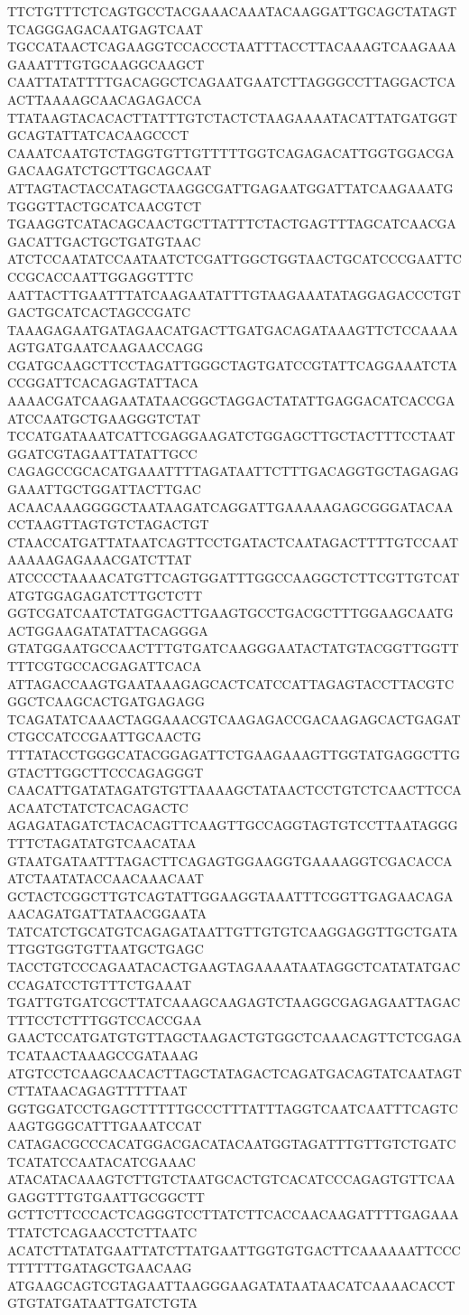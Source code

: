 TTCTGTTTCTCAGTGCCTACGAAACAAATACAAGGATTGCAGCTATAGTTCAGGGAGACAATGAGTCAAT
TGCCATAACTCAGAAGGTCCACCCTAATTTACCTTACAAAGTCAAGAAAGAAATTTGTGCAAGGCAAGCT
CAATTATATTTTGACAGGCTCAGAATGAATCTTAGGGCCTTAGGACTCAACTTAAAAGCAACAGAGACCA
TTATAAGTACACACTTATTTGTCTACTCTAAGAAAATACATTATGATGGTGCAGTATTATCACAAGCCCT
CAAATCAATGTCTAGGTGTTGTTTTTGGTCAGAGACATTGGTGGACGAGACAAGATCTGCTTGCAGCAAT
ATTAGTACTACCATAGCTAAGGCGATTGAGAATGGATTATCAAGAAATGTGGGTTACTGCATCAACGTCT
TGAAGGTCATACAGCAACTGCTTATTTCTACTGAGTTTAGCATCAACGAGACATTGACTGCTGATGTAAC
ATCTCCAATATCCAATAATCTCGATTGGCTGGTAACTGCATCCCGAATTCCCGCACCAATTGGAGGTTTC
AATTACTTGAATTTATCAAGAATATTTGTAAGAAATATAGGAGACCCTGTGACTGCATCACTAGCCGATC
TAAAGAGAATGATAGAACATGACTTGATGACAGATAAAGTTCTCCAAAAAGTGATGAATCAAGAACCAGG
CGATGCAAGCTTCCTAGATTGGGCTAGTGATCCGTATTCAGGAAATCTACCGGATTCACAGAGTATTACA
AAAACGATCAAGAATATAACGGCTAGGACTATATTGAGGACATCACCGAATCCAATGCTGAAGGGTCTAT
TCCATGATAAATCATTCGAGGAAGATCTGGAGCTTGCTACTTTCCTAATGGATCGTAGAATTATATTGCC
CAGAGCCGCACATGAAATTTTAGATAATTCTTTGACAGGTGCTAGAGAGGAAATTGCTGGATTACTTGAC
ACAACAAAGGGGCTAATAAGATCAGGATTGAAAAAGAGCGGGATACAACCTAAGTTAGTGTCTAGACTGT
CTAACCATGATTATAATCAGTTCCTGATACTCAATAGACTTTTGTCCAATAAAAAGAGAAACGATCTTAT
ATCCCCTAAAACATGTTCAGTGGATTTGGCCAAGGCTCTTCGTTGTCATATGTGGAGAGATCTTGCTCTT
GGTCGATCAATCTATGGACTTGAAGTGCCTGACGCTTTGGAAGCAATGACTGGAAGATATATTACAGGGA
GTATGGAATGCCAACTTTGTGATCAAGGGAATACTATGTACGGTTGGTTTTTCGTGCCACGAGATTCACA
ATTAGACCAAGTGAATAAAGAGCACTCATCCATTAGAGTACCTTACGTCGGCTCAAGCACTGATGAGAGG
TCAGATATCAAACTAGGAAACGTCAAGAGACCGACAAGAGCACTGAGATCTGCCATCCGAATTGCAACTG
TTTATACCTGGGCATACGGAGATTCTGAAGAAAGTTGGTATGAGGCTTGGTACTTGGCTTCCCAGAGGGT
CAACATTGATATAGATGTGTTAAAAGCTATAACTCCTGTCTCAACTTCCAACAATCTATCTCACAGACTC
AGAGATAGATCTACACAGTTCAAGTTGCCAGGTAGTGTCCTTAATAGGGTTTCTAGATATGTCAACATAA
GTAATGATAATTTAGACTTCAGAGTGGAAGGTGAAAAGGTCGACACCAATCTAATATACCAACAAACAAT
GCTACTCGGCTTGTCAGTATTGGAAGGTAAATTTCGGTTGAGAACAGAAACAGATGATTATAACGGAATA
TATCATCTGCATGTCAGAGATAATTGTTGTGTCAAGGAGGTTGCTGATATTGGTGGTGTTAATGCTGAGC
TACCTGTCCCAGAATACACTGAAGTAGAAAATAATAGGCTCATATATGACCCAGATCCTGTTTCTGAAAT
TGATTGTGATCGCTTATCAAAGCAAGAGTCTAAGGCGAGAGAATTAGACTTTCCTCTTTGGTCCACCGAA
GAACTCCATGATGTGTTAGCTAAGACTGTGGCTCAAACAGTTCTCGAGATCATAACTAAAGCCGATAAAG
ATGTCCTCAAGCAACACTTAGCTATAGACTCAGATGACAGTATCAATAGTCTTATAACAGAGTTTTTAAT
GGTGGATCCTGAGCTTTTTGCCCTTTATTTAGGTCAATCAATTTCAGTCAAGTGGGCATTTGAAATCCAT
CATAGACGCCCACATGGACGACATACAATGGTAGATTTGTTGTCTGATCTCATATCCAATACATCGAAAC
ATACATACAAAGTCTTGTCTAATGCACTGTCACATCCCAGAGTGTTCAAGAGGTTTGTGAATTGCGGCTT
GCTTCTTCCCACTCAGGGTCCTTATCTTCACCAACAAGATTTTGAGAAATTATCTCAGAACCTCTTAATC
ACATCTTATATGAATTATCTTATGAATTGGTGTGACTTCAAAAAATTCCCTTTTTTGATAGCTGAACAAG
ATGAAGCAGTCGTAGAATTAAGGGAAGATATAATAACATCAAAACACCTGTGTATGATAATTGATCTGTA
